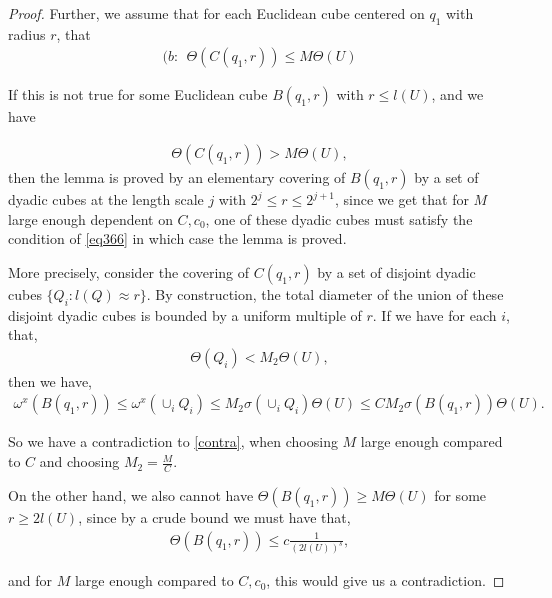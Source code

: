 \documentclass{article}
\newcounter{lem}
\theoremstyle{plain}
\theoremstyle{plain}
\newcommand{\D}{\mathbb{D}}
\theoremstyle{definition}
\theoremstyle{plain}
\begin{document}
\begin{proof}

Further, we assume that for each Euclidean cube centered on $q_1$ with radius $r$, that
\begin{align}\label{b}
(b:\ \ \Theta(C(q_1,r))\leq M\Theta(U)
\end{align}

If this is not true for some Euclidean cube $B(q_1,r)$ with $r\leq l(U)$, and we have 

\begin{align}\label{contra}
\Theta(C(q_1,r))>M\Theta(U),
\end{align}
then the lemma is proved by an elementary covering of $B(q_1,r)$ by a set of dyadic cubes at the length scale $j$ with $2^{j} \leq r\leq 2^{j+1}$, since we get that for $M$ large enough dependent on $C,c_0$, one of these dyadic cubes must satisfy the condition of \cref{eq366} in which case the lemma is proved. 

More precisely, consider the covering of $C(q_1,r)$ by a set of disjoint dyadic cubes $\{Q_i:l(Q)\approx r\}$. By construction, the total diameter of the union of these disjoint dyadic cubes is bounded by a uniform multiple of $r$. If we have for each $i$, that, 
\begin{align*}
    \Theta(Q_i)<M_2 \Theta(U), 
\end{align*}
then we have, 
\begin{align*}
    \omega^x(B(q_1,r))\leq \omega^x(\cup_{i}Q_i)\leq M_2 \sigma(\cup_{i}Q_i)\Theta(U)\leq CM_2 \sigma(B(q_1,r))\Theta(U).
\end{align*}

So we have a contradiction to \cref{contra}, when choosing $M$ large enough compared to $C$ and choosing $M_2=\frac{M}{C}$.


On the other hand, we also cannot have $\Theta(B(q_1,r))\geq M\Theta(U)$ for some $r\geq 2l(U)$, since by a crude bound we must have that,
\begin{align*}
    \Theta(B(q_1,r))\leq c\frac{1}{(2 l(U))^s},
\end{align*}

and for $M$ large enough compared to $C, c_0$, this would give us a contradiction.



\end{proof}
\end{document}
